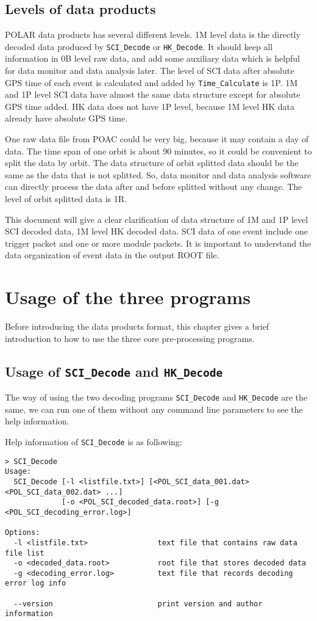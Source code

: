 \documentclass[a4paper, 12pt, onecolumn]{article}
\begin{document}
\subsection{Levels of data products}
POLAR data products has several different levels. 1M level data is the directly decoded data produced by \texttt{SCI\_Decode} or \texttt{HK\_Decode}.
It should keep all information in 0B level raw data, and add some auxiliary data which is helpful for data monitor and data analysis later. 
The level of SCI data after absolute GPS time of each event is calculated and added by \texttt{Time\_Calculate} is 1P.
1M and 1P level SCI data have almost the same data structure except for absolute GPS time added.
HK data does not have 1P level, because 1M level HK data already have absolute GPS time.

One raw data file from POAC could be very big, because it may contain a day of data.
The time span of one orbit is about 90 minutes, so it could be convenient to split the data by orbit.
The data structure of orbit splitted data should be the same as the data that is not splitted.
So, data monitor and data analysis software can directly process the data after and before splitted without any change.
The level of orbit splitted data is 1R.

This document will give a clear clarification of data structure of 1M and 1P level SCI decoded data, 1M level HK decoded data.
SCI data of one event include one trigger packet and one or more module packets.
It is important to understand the data organization of event data in the output ROOT file.

\section{Usage of the three programs}
Before introducing the data products format, this chapter gives a brief introduction to how to use the three core pre-processing programs.

\subsection{Usage of \texttt{SCI\_Decode} and \texttt{HK\_Decode}}
The way of using the two decoding programs \texttt{SCI\_Decode} and \texttt{HK\_Decode} are the same, we can run one of them without any command line parameters to see the help information.

Help information of \texttt{SCI\_Decode} is as following:
\begin{Verbatim}[fontsize=\scriptsize, frame=single]
> SCI_Decode
Usage:
  SCI_Decode [-l <listfile.txt>] [<POL_SCI_data_001.dat> <POL_SCI_data_002.dat> ...]
             [-o <POL_SCI_decoded_data.root>] [-g <POL_SCI_decoding_error.log>]

Options:
  -l <listfile.txt>                text file that contains raw data file list
  -o <decoded_data.root>           root file that stores decoded data
  -g <decoding_error.log>          text file that records decoding error log info

  --version                        print version and author information
\end{Verbatim}
\end{document}
